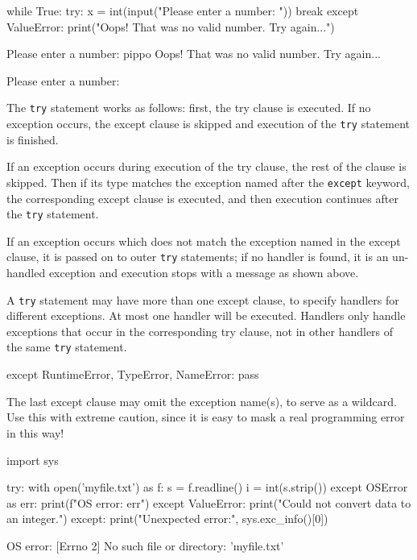 \begin{ipython}
while True: 
    try:
        x = int(input("Please enter a number: ")) 
        break
    except ValueError:
        print("Oops! That was no valid number. Try again...")
\end{ipython}
\begin{ioutput}
Please enter a number: pippo
Oops!  That was no valid number.  Try again...

Please enter a number:
\end{ioutput}

The \texttt{try} statement works as follows: first, the try clause is executed. If no exception occurs, the except clause is skipped and execution of the \texttt{try} statement is finished.

If an exception occurs during execution of the try clause, the rest of the clause is skipped. Then if its type matches the exception named after the \texttt{except} keyword, the corresponding except clause is executed, and then execution continues after the \texttt{try} statement.

If an exception occurs which does not match the exception named in the except clause, it is passed on to outer \texttt{try} statements; if no handler is found, it is an un-handled exception and execution stops with a message as shown above.

A \texttt{try} statement may have more than one except clause, to specify handlers for different exceptions. At most one handler will be executed. Handlers only handle exceptions that occur in the corresponding try clause, not in other handlers of the same \texttt{try} statement.

\begin{ipython}
    except RuntimeError, TypeError, NameError:
        pass	
\end{ipython}

The last except clause may omit the exception name(s), to serve as a wildcard. Use this with extreme caution, since it is easy to mask a real programming error in this way! 

\begin{ipython}
import sys 

try:
    with open('myfile.txt') as f: 
        s = f.readline()
        i = int(s.strip()) 
except OSError as err:
    print(f"OS error: {err}") 
except ValueError:
    print("Could not convert data to an integer.") 
except:
    print("Unexpected error:", sys.exc_info()[0])
\end{ipython}
\begin{ioutput}
OS error: [Errno 2] No such file or directory: 'myfile.txt'	
\end{ioutput}

